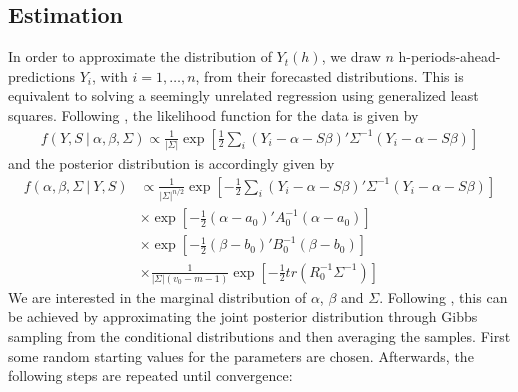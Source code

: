 \documentclass[a4paper,fleqn,11pt]{article}
\begin{document}
\subsection{Estimation}
In order to approximate the distribution of $Y_t(h)$, we draw $n$ h-periods-ahead-predictions $Y_i$, with $i = 1, \hdots, n$, from their forecasted distributions. This is equivalent to solving a seemingly unrelated regression using generalized least squares. Following \cite{Greenberg2008}, the likelihood function for the data is given by 
\begin{align*}
f(Y,S\ |\ \alpha,\beta,\Sigma) \propto \frac{1}{|\Sigma|}\exp\left[\frac{1}{2} \sum_i (Y_i - \alpha - S\beta)'\Sigma^{-1}(Y_i - \alpha - S\beta)\right]
\end{align*}
and the posterior distribution is accordingly given by
\begin{align*}
f(\alpha,\beta,\Sigma\ |\ Y,S) & \propto \frac{1}{|\Sigma|^{n/2}}\exp\left[-\frac{1}{2} \sum_i (Y_i - \alpha - S\beta)'\Sigma^{-1}(Y_i - \alpha - S\beta)\right] \\
&\times \exp \left[-\frac{1}{2}(\alpha - a_0)'A_0^{-1}(\alpha - a_0)\right] \\
&\times \exp \left[-\frac{1}{2}(\beta - b_0)'B_0^{-1}(\beta - b_0)\right] \\
&\times \frac{1}{|\Sigma|(v_0 - m - 1)} \exp \left[-\frac{1}{2} tr(R_0^{-1}\Sigma^{-1}) \right]
\end{align*}
We are interested in the marginal distribution of $\alpha$, $\beta$ and $\Sigma$. Following \cite{Percy1992}, this can be achieved by approximating the joint posterior distribution through Gibbs sampling from the conditional distributions and then averaging the samples. First some random starting values for the parameters are chosen. Afterwards, the following steps are repeated until convergence:
\end{document}
